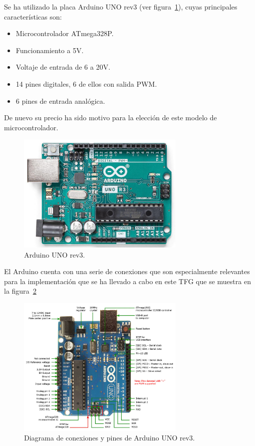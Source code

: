 \documentclass[a4paper, 12pt, oneside]{book}
\begin{document}
Se ha utilizado la placa Arduino UNO rev3 (ver figura~\ref{figura:arduino}), cuyas principales características son:

\begin{itemize}
	\item Microcontrolador ATmega328P.
	
	\item Funcionamiento a 5V.
	
	\item Voltaje de entrada de 6 a 20V.
	
	\item 14 pines digitales, 6 de ellos con salida PWM.

	\item 6 pines de entrada analógica.
\end{itemize}

De nuevo su precio ha sido motivo para la elección de este modelo de microcontrolador.

\begin{figure}[H]
	\centering
    \includegraphics[width=8cm, keepaspectratio]{img/arduino}
    \caption{Arduino UNO rev3.}
    \label{figura:arduino}
\end{figure}

El Arduino cuenta con una serie de conexiones que son especialmente relevantes para la implementación que se ha llevado a cabo en este TFG que se muestra en la figura~\ref{figura:conexiones_arduino}

\begin{figure}[H]
	\centering
    \includegraphics[width=8cm, keepaspectratio]{img/conexiones_arduino}
    \caption{Diagrama de conexiones y pines de Arduino UNO rev3.}
    \label{figura:conexiones_arduino}
\end{figure}
\end{document}
